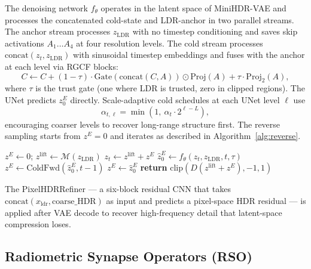 \documentclass[10pt,twocolumn,letterpaper]{article}
\newcommand{\zlift}{z^{\mathrm{lift}}}
\newcommand{\xldr}{x_{\mathrm{ldr}}}
\begin{document}
The denoising network $f_\theta$ operates in the latent space of MiniHDR-VAE and processes the concatenated cold-state and LDR-anchor in two parallel streams. The anchor stream processes $z_{\mathrm{LDR}}$ with no timestep conditioning and saves skip activations $A_1 \ldots A_4$ at four resolution levels. The cold stream processes $\mathrm{concat}(z_t, z_{\mathrm{LDR}})$ with sinusoidal timestep embeddings and fuses with the anchor at each level via RGCF blocks:
\begin{equation}
C \leftarrow C + (1-\tau)\cdot \mathrm{Gate}(\mathrm{concat}(C,A)) \odot \mathrm{Proj}(A) + \tau \cdot \mathrm{Proj}_2(A),
\label{eq:rgcf}
\end{equation}
where $\tau$ is the trust gate (one where LDR is trusted, zero in clipped regions). The UNet predicts $z_0^E$ directly. Scale-adaptive cold schedules at each UNet level $\ell$ use
\begin{equation}
\alpha_{t,\ell} = \min\!\left(1,\ \alpha_t \cdot 2^{\ell-L}\right),
\label{eq:scale-adaptive}
\end{equation}
encouraging coarser levels to recover long-range structure first. The reverse sampling starts from $z^E=0$ and iterates as described in Algorithm~\ref{alg:reverse}.

\begin{algorithm}[t]
\caption{Reverse Cold Sampling (\texttt{restore\_hdr})}
\label{alg:reverse}
\begin{algorithmic}[1]
\STATE $z^E \leftarrow 0$; $\zlift \leftarrow \mathcal{M}(z_{\mathrm{LDR}})$
  \STATE $z_t \leftarrow \zlift + z^E$
  \STATE $\hat z_0^E \leftarrow f_\theta(z_t, z_{\mathrm{LDR}}, t, \tau)$
    \STATE $z^E \leftarrow \mathrm{ColdFwd}(\hat z_0^E, t-1)$
  \ELSE
    \STATE $z^E \leftarrow \hat z_0^E$
  \ENDIF
\ENDFOR
\STATE \textbf{return} $\mathrm{clip}(D(\zlift + z^E), -1, 1)$
\end{algorithmic}
\end{algorithm}

The PixelHDRRefiner --- a six-block residual CNN that takes $\mathrm{concat}(\xldr, \mathrm{coarse\_HDR})$ as input and predicts a pixel-space HDR residual --- is applied after VAE decode to recover high-frequency detail that latent-space compression loses.

\subsection{Radiometric Synapse Operators (RSO)}
\end{document}
